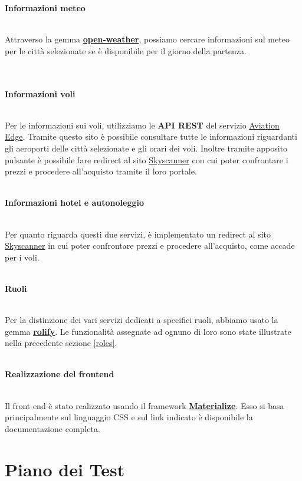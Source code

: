 \documentclass[11pt]{article}
\begin{document}
\begin{large}\textbf{Informazioni meteo}\end{large}\\ 
Attraverso la gemma \href{https://github.com/coderhs/ruby_open_weather_map}{\textbf{open-weather}}, possiamo cercare informazioni sul meteo per le città selezionate se è disponibile per il giorno della partenza.
\\\\\\
\begin{large}\textbf{Informazioni voli}\end{large}\\
Per le informazioni sui voli, utilizziamo le \textbf{API REST} del servizio \href{https://aviation-edge.com/}{Aviation Edge}. Tramite questo sito è possibile consultare tutte le informazioni riguardanti gli aeroporti delle città selezionate e gli orari dei voli. Inoltre tramite apposito pulsante è possibile fare redirect al sito \href{https://www.skyscanner.it}{Skyscanner} con cui poter confrontare i prezzi e procedere all'acquisto tramite il loro portale.
\\\\
\begin{large}\textbf{Informazioni hotel e autonoleggio}\end{large}\\
Per quanto riguarda questi due servizi, è implementato un redirect al sito \href{https://www.skyscanner.it}{Skyscanner} in cui poter confrontare prezzi e procedere all'acquisto, come accade per i voli.
\\\\
\begin{large}\textbf{Ruoli}\end{large}\\
Per la distinzione dei vari servizi dedicati a specifici ruoli, abbiamo usato la gemma \href{https://github.com/RolifyCommunity/rolify}{\textbf{rolify}}. Le funzionalità assegnate ad ognuno di loro sono state illustrate nella precedente sezione \ref{roles}.
\\\\
\begin{large}\textbf{Realizzazione del frontend}\end{large}\\
Il front-end è stato realizzato usando il framework \href{https://github.com/Dogfalo/materialize}{\textbf{Materialize}}. Esso si basa principalmente sul linguaggio CSS e sul link indicato è disponibile la documentazione completa.


\section{Piano dei Test}
\end{document}
